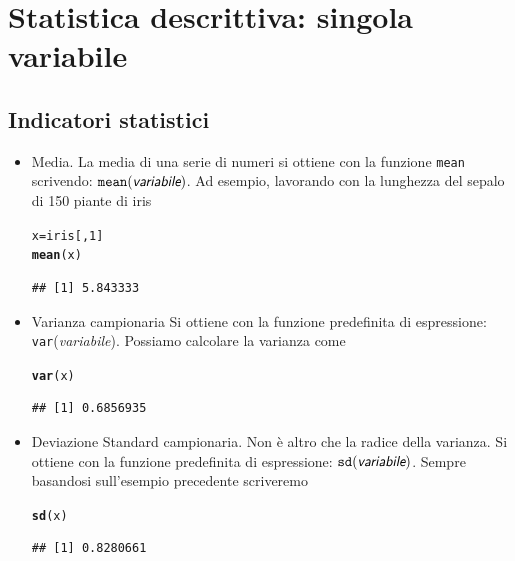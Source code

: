 \documentclass[onecolumn,12pt]{book}\usepackage[]{graphicx}\usepackage[]{color}
\makeatletter
\newcommand{\hlnum}[1]{\textcolor[rgb]{0.686,0.059,0.569}{#1}}%
\newcommand{\hlstd}[1]{\textcolor[rgb]{0.345,0.345,0.345}{#1}}%
\newcommand{\hlkwb}[1]{\textcolor[rgb]{0.69,0.353,0.396}{#1}}%
\newcommand{\hlkwd}[1]{\textcolor[rgb]{0.737,0.353,0.396}{\textbf{#1}}}%
\newenvironment{kframe}{%
 \def\at@end@of@kframe{}%
 \ifinner\ifhmode%
  \def\at@end@of@kframe{\end{minipage}}%
  \begin{minipage}{\columnwidth}%
 \fi\fi%
 \def\FrameCommand##1{\hskip\@totalleftmargin \hskip-\fboxsep
 \colorbox{shadecolor}{##1}\hskip-\fboxsep
     \hskip-\linewidth \hskip-\@totalleftmargin \hskip\columnwidth}%
 \MakeFramed {\advance\hsize-\width
   \@totalleftmargin\z@ \linewidth\hsize
   \@setminipage}}%
 {\par\unskip\endMakeFramed%
 \at@end@of@kframe}
\newenvironment{knitrout}{}{} %
\newcommand{\varia}[1]{\textsl{\textsf{#1}}}
\makeatother
\begin{document}
\section{Statistica descrittiva: singola variabile}
\subsection{Indicatori statistici}
\begin{itemize}
\item{}Media.\vskip0pt
La media di una serie di numeri si ottiene con la funzione \texttt{mean} scrivendo:
$\texttt{mean}(\varia{variabile})$.
Ad esempio, lavorando con la lunghezza del sepalo di 150 piante di iris
\begin{knitrout}
\color{fgcolor}\begin{kframe}
\begin{alltt}
\hlstd{x}\hlkwb{=}\hlstd{iris[,}\hlnum{1}\hlstd{]}
\hlkwd{mean}\hlstd{(x)}
\end{alltt}
\begin{verbatim}
## [1] 5.843333
\end{verbatim}
\end{kframe}
\end{knitrout}
\item{}Varianza campionaria\vskip0pt
Si ottiene con la funzione predefinita di espressione:
\texttt{var}(\varia{variabile}).
Possiamo calcolare la varianza come
\begin{knitrout}
\color{fgcolor}\begin{kframe}
\begin{alltt}
\hlkwd{var}\hlstd{(x)}
\end{alltt}
\begin{verbatim}
## [1] 0.6856935
\end{verbatim}
\end{kframe}
\end{knitrout}
\item{}Deviazione Standard campionaria.\vskip0pt
Non \`e altro che la radice della varianza. Si ottiene con la funzione predefinita di espressione:
$\texttt{sd}(\varia{variabile})$.
Sempre basandosi sull'esempio precedente scriveremo
\begin{knitrout}
\color{fgcolor}\begin{kframe}
\begin{alltt}
\hlkwd{sd}\hlstd{(x)}
\end{alltt}
\begin{verbatim}
## [1] 0.8280661
\end{verbatim}
\end{kframe}
\end{knitrout}


\end{itemize}
\end{document}
